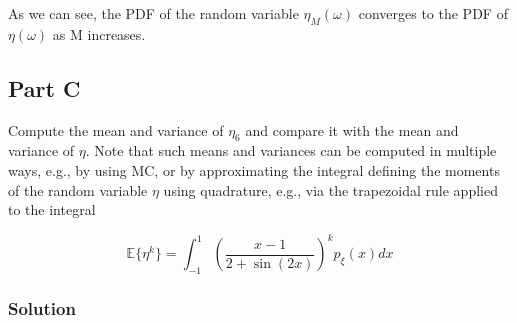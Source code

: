 \documentclass[
]{article}
\begin{document}
\begin{figure}


\caption{\label{fig-q2pb}}

\end{figure}%

As we can see, the PDF of the random variable \(\eta_M(\omega)\)
converges to the PDF of \(\eta(\omega)\) as M increases.

\subsection{Part C}\label{part-c-1}

Compute the mean and variance of \(\eta_6\) and compare it with the mean
and variance of \(\eta\). Note that such means and variances can be
computed in multiple ways, e.g., by using MC, or by approximating the
integral defining the moments of the random variable \(\eta\) using
quadrature, e.g., via the trapezoidal rule applied to the integral

\begin{equation}\tag{6}\label{quadr}
\mathbb{E}\{\eta^k\} = \int_{-1}^{1} \left(\frac{x-1}{2+\sin(2x)}\right)^k p_{\xi}(x)dx
\end{equation}

\subsubsection{Solution}\label{solution-5}
\end{document}
